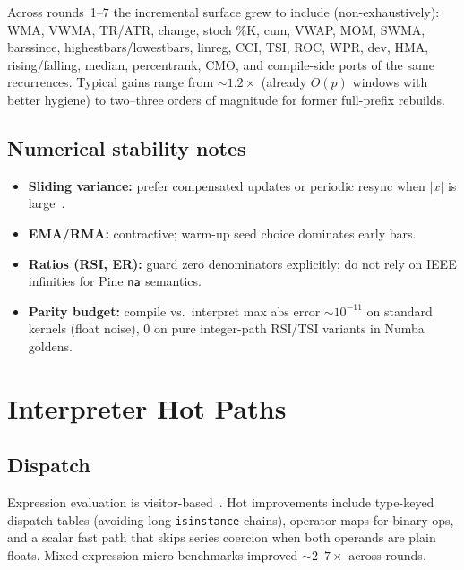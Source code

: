 \documentclass[11pt,a4paper]{article}
\begin{document}
Across rounds~1--7 the incremental surface grew to include (non-exhaustively):
WMA, VWMA, TR/ATR, change, stoch \%K, cum, VWAP, MOM, SWMA, barssince,
highestbars/lowestbars, linreg, CCI, TSI, ROC, WPR, dev, HMA, rising/falling,
median, percentrank, CMO, and compile-side ports of the same recurrences.
Typical gains range from $\sim 1.2\times$ (already $O(p)$ windows with better
hygiene) to two--three orders of magnitude for former full-prefix rebuilds.

\subsection{Numerical stability notes}
\label{sec:inc-stability}

\begin{itemize}[leftmargin=*]
  \item \textbf{Sliding variance:} prefer compensated updates or periodic
        resync when $|x|$ is large~\citep{higham2002accuracy}.
  \item \textbf{EMA/RMA:} contractive; warm-up seed choice dominates early bars.
  \item \textbf{Ratios (RSI, ER):} guard zero denominators explicitly; do not
        rely on IEEE infinities for Pine $\textsf{na}$ semantics.
  \item \textbf{Parity budget:} compile vs.\ interpret max abs error
        $\sim 10^{-11}$ on standard kernels (float noise), $0$ on pure
        integer-path RSI/TSI variants in Numba goldens.
\end{itemize}

\section{Interpreter Hot Paths}
\label{sec:hot}

\subsection{Dispatch}

Expression evaluation is visitor-based~\citep{gamma1994design,nystrom2021crafting}.
Hot improvements include type-keyed dispatch tables (avoiding long
\texttt{isinstance} chains), operator maps for binary ops, and a scalar fast
path that skips series coercion when both operands are plain floats.  Mixed
expression micro-benchmarks improved $\sim 2$--$7\times$ across rounds.
\end{document}
